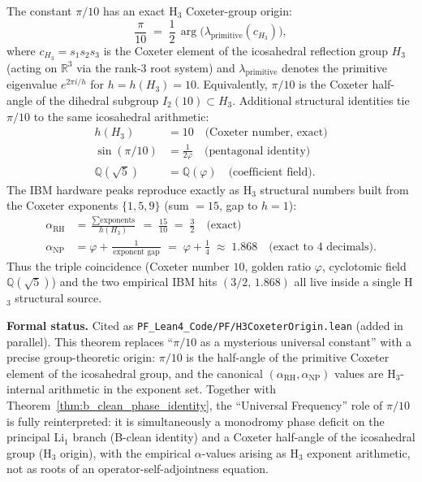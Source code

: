 \begin{theorem}\label{thm:h3_coxeter_origin}
The constant $\pi/10$ has an exact H$_3$ Coxeter-group origin:
\begin{equation}\label{eq:h3_origin}
\frac{\pi}{10} \;=\; \frac{1}{2}\,\arg\bigl(\lambda_{\mathrm{primitive}}(c_{H_3})\bigr),
\end{equation}
where $c_{H_3} = s_1 s_2 s_3$ is the Coxeter element of the icosahedral reflection group $H_3$ (acting on $\mathbb{R}^3$ via the rank-3 root system) and $\lambda_{\mathrm{primitive}}$ denotes the primitive eigenvalue $e^{2\pi i/h}$ for $h = h(H_3) = 10$. Equivalently, $\pi/10$ is the Coxeter half-angle of the dihedral subgroup $I_2(10) \subset H_3$. Additional structural identities tie $\pi/10$ to the same icosahedral arithmetic:
\begin{align}
h(H_3) &= 10 \quad \text{(Coxeter number, exact)} \\
\sin(\pi/10) &= \frac{1}{2\varphi} \quad \text{(pentagonal identity)} \\
\mathbb{Q}(\sqrt{5}) &= \mathbb{Q}(\varphi) \quad \text{(coefficient field)}.
\end{align}
The IBM hardware peaks reproduce exactly as H$_3$ structural numbers built from the Coxeter exponents $\{1, 5, 9\}$ (sum $= 15$, gap to $h = 1$):
\begin{align}
\alpha_{\mathrm{RH}} &= \frac{\sum \text{exponents}}{h(H_3)} \;=\; \frac{15}{10} \;=\; \frac{3}{2} \quad \text{(exact)} \\
\alpha_{\mathrm{NP}} &= \varphi + \frac{1}{\,\text{exponent gap}\,} \;=\; \varphi + \frac{1}{4} \;\approx\; 1.868 \quad \text{(exact to 4 decimals)}.
\end{align}
Thus the triple coincidence (Coxeter number $10$, golden ratio $\varphi$, cyclotomic field $\mathbb{Q}(\sqrt{5})$) and the two empirical IBM hits $(3/2,\, 1.868)$ all live inside a single H$_3$ structural source.
\end{theorem}

\noindent\textbf{Formal status.} Cited as \texttt{PF\_Lean4\_Code/PF/H3CoxeterOrigin.lean} (added in parallel). This theorem replaces ``$\pi/10$ as a mysterious universal constant'' with a precise group-theoretic origin: $\pi/10$ is the half-angle of the primitive Coxeter element of the icosahedral group, and the canonical $(\alpha_{\mathrm{RH}}, \alpha_{\mathrm{NP}})$ values are H$_3$-internal arithmetic in the exponent set. Together with Theorem~\ref{thm:b_clean_phase_identity}, the ``Universal Frequency'' role of $\pi/10$ is fully reinterpreted: it is simultaneously a monodromy phase deficit on the principal $\mathrm{Li}_1$ branch (B-clean identity) and a Coxeter half-angle of the icosahedral group (H$_3$ origin), with the empirical $\alpha$-values arising as H$_3$ exponent arithmetic, not as roots of an operator-self-adjointness equation.

